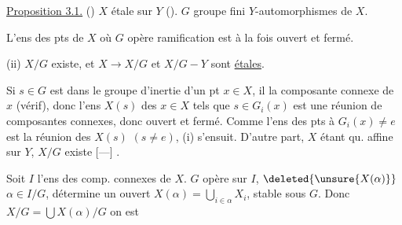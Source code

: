 \uline{Proposition 3.1.} () $X$ étale sur $Y$ ().
$G$ groupe fini  $Y$-automorphismes de $X$.

  L'ens des pts de $X$ où $G$ opère  ramification est à la fois ouvert et fermé.

(ii)  $X/G$ existe, et $X\to X/G$ et $X/G-Y$ sont \uline{étales}.


Si $s\in G$  est dans le groupe d'inertie d'un pt $x\in X$, il  la composante connexe de $x$ (vérif), donc l'ens $X(s)$ des $x\in X$ tels que $s\in G_i(x)$ est une réunion de composantes connexes, donc ouvert et fermé.
Comme  l'ens des pts à $G_i(x)\ne e$ est la réunion des $X(s)$ $(s\ne e)$, (i) s'ensuit.
D'autre part, $X$ étant qu. affine sur $Y$, $X/G$ existe [---]
  .

Soit $I$ l'ens des comp. connexes de $X$.
$G$ opère sur $I$, 
 $\deleted{\unsure{X(\alpha)}}$ $\alpha\in I/G$, détermine un ouvert $X(\alpha)=\bigcup_{i\in\alpha}X_i$, stable sous $G$.
Donc $X/G=\bigcup X(\alpha)/G$ on est
